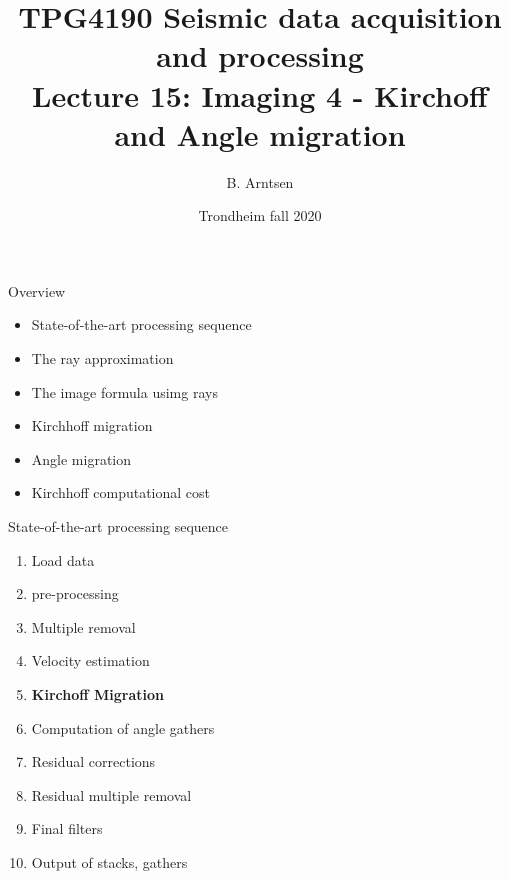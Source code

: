 \documentclass[xcolor=dvipsnames,notes]{beamer}
\begin{document}
\title{TPG4190 Seismic data acquisition and processing \\
               Lecture 15: Imaging 4 - Kirchoff and Angle migration}
\author{B. Arntsen}
\date{Trondheim fall 2020}
\begin{frame}
 \titlepage
\end{frame}
%
\begin{frame}{Overview}
\begin{itemize}
  \item State-of-the-art processing sequence
  \item The ray approximation
  \item The image formula usimg rays
  \item Kirchhoff migration
  \item Angle migration
  \item Kirchhoff computational cost
  \end{itemize}
\end{frame}
\begin{frame}{State-of-the-art processing sequence}
\begin{enumerate}
  \item Load data
  \item pre-processing
  \item Multiple removal
  \item Velocity estimation
  \item \textbf{Kirchoff Migration}
  \item Computation of angle gathers
  \item Residual corrections 
  \item Residual multiple removal
  \item Final filters
  \item Output of stacks, gathers
\end{enumerate}
\end{frame}
\end{document}
